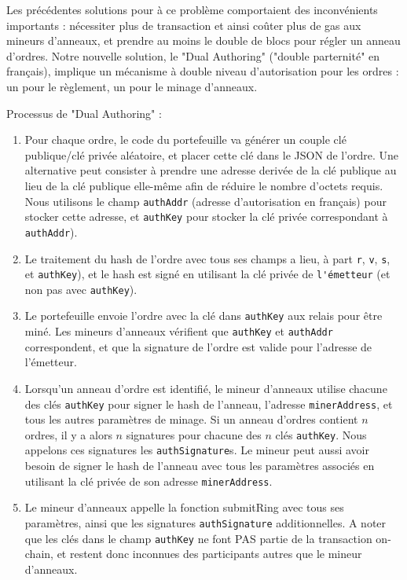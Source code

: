 \documentclass[UTF8,nofonts]{article}
\begin{document}
\begin{multicols}{2}
Les précédentes solutions pour à ce problème comportaient des inconvénients importants : nécessiter plus de transaction et ainsi coûter plus de gas aux mineurs d'anneaux, et prendre au moins le double de blocs pour régler un anneau d'ordres. Notre nouvelle solution, le "Dual Authoring" \cite{dualauthor} ("double parternité" en français), implique un mécanisme à double niveau d'autorisation pour les ordres : un pour le règlement, un pour le minage d'anneaux. 

Processus de "Dual Authoring" :

\begin{enumerate}

	\item Pour chaque ordre, le code du portefeuille va générer un couple clé publique/clé privée aléatoire, et placer cette clé dans le JSON de l'ordre. Une alternative peut consister à prendre une adresse derivée de la clé publique au lieu de la clé publique elle-même afin de réduire le nombre d'octets requis. Nous utilisons le champ \verb|authAddr| (adresse d'autorisation en français) pour stocker cette adresse, et \verb|authKey| pour stocker la clé privée correspondant à \verb|authAddr|).

	\item Le traitement du hash de l'ordre avec tous ses champs a lieu, à part \verb|r|, \verb|v|, \verb|s|, et \verb|authKey|), et le hash est signé en utilisant la clé privée de \verb|l'émetteur| (et non pas avec \verb|authKey|).

	\item Le portefeuille envoie l'ordre avec la clé dans \verb|authKey| aux relais pour être miné. Les mineurs d'anneaux vérifient que \verb|authKey| et \verb|authAddr| correspondent, et que la signature de l'ordre est valide pour l'adresse de l'émetteur.

	\item Lorsqu'un anneau d'ordre est identifié, le mineur d'anneaux utilise chacune des clés \verb|authKey| pour signer le hash de l'anneau, l'adresse \verb|minerAddress|, et tous les autres paramètres de minage. Si un anneau d'ordres contient $n$ ordres, il y a alors $n$ signatures pour chacune des $n$ clés \verb|authKey|. Nous appelons ces signatures les \verb|authSignature|s. Le mineur peut aussi avoir besoin de signer le hash de l'anneau avec tous les paramètres associés en utilisant la clé privée de son adresse \verb|minerAddress|.

	\item Le mineur d'anneaux appelle la fonction submitRing avec tous ses paramètres, ainsi que les signatures \verb|authSignature| additionnelles. A noter que les clés dans le champ \verb|authKey| ne font PAS partie de la transaction on-chain, et restent donc inconnues des participants autres que le mineur d'anneaux.


\end{enumerate}
\end{multicols}
\end{document}
